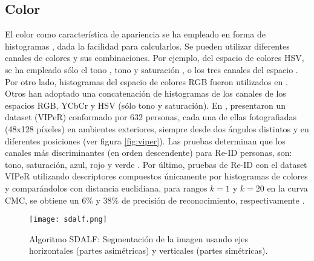 \documentclass[../memoria.tex]{subfiles}
\begin{document}
\subsection{Color}
El color como característica de apariencia se ha empleado en forma de histogramas \cite{gheissari2006person, gray2008viewpoint, javed2008modeling, oliveira2009people, farenzena2010person, prosser2010person, zheng2011person}, dada la facilidad para calcularlos. Se pueden utilizar diferentes canales de colores y sus combinaciones. Por ejemplo, del espacio de colores HSV, se ha empleado sólo el tono \cite{oliveira2009people},  tono y saturación \cite{gheissari2006person}, o los tres canales del espacio \cite{farenzena2010person}. Por otro lado, histogramas del espacio de colores RGB fueron utilizados en \cite{prosserxiang2008multi, javed2008modeling, berdugo2010object}. Otros\cite{gray2008viewpoint, prosser2010person, zheng2011person} han adoptado una concatenación de histogramas de los canales de los espacios RGB, YCbCr y HSV (sólo tono y saturación). En \cite{gray2008viewpoint}, presentaron un dataset (VIPeR) conformado por 632 personas, cada una de ellas fotografiadas (48x128 píxeles) en ambientes exteriores, siempre desde dos ángulos distintos y en diferentes posiciones (ver figura \ref{fig:viper}). Las pruebas determinan que los canales más discriminantes (en orden descendente) para Re-ID personas, son: tono, saturación, azul, rojo y verde \cite{mazzon2012person}. Por último, pruebas de Re-ID con el dataset VIPeR utilizando descriptores compuestos únicamente por histogramas de colores y comparándolos con distancia euclidiana, para rangos $k=1$ y $k=20$ en la curva CMC, se obtiene un 6\% y 38\% de precisión de reconocimiento, respectivamente \cite{hirzer2012relaxed}.


\begin{figure}
  \centering
  \texttt{[image: sdalf.png]}
  \caption{Algoritmo SDALF: Segmentación de la imagen usando ejes horizontales (partes asimétricas) y verticales (partes simétricas).}
  \label{fig:sdalf}
\end{figure}
\end{document}
